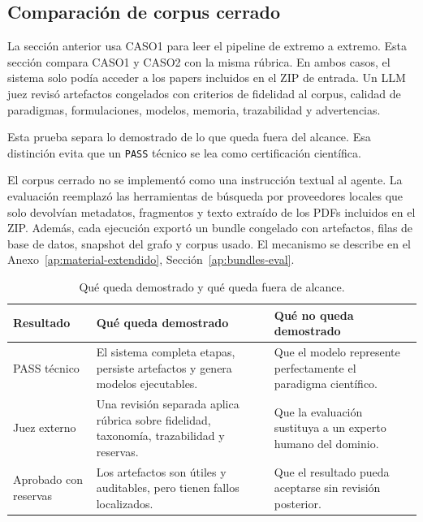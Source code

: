 \subsection{Comparación de corpus cerrado}
\label{sec:evaluacion-corpus-cerrado}

La sección anterior usa CASO1 para leer el pipeline de extremo a extremo. Esta
sección compara CASO1 y CASO2 con la misma rúbrica. En ambos casos, el sistema
solo podía acceder a los papers incluidos en el ZIP de entrada. Un LLM juez
revisó artefactos congelados con criterios de fidelidad al corpus, calidad de
paradigmas, formulaciones, modelos, memoria, trazabilidad y advertencias.

Esta prueba separa lo demostrado de lo que queda fuera del alcance. Esa
distinción evita que un \texttt{PASS} técnico se lea como certificación
científica.

El corpus cerrado no se implementó como una instrucción textual al agente. La
evaluación reemplazó las herramientas de búsqueda por proveedores locales que
solo devolvían metadatos, fragmentos y texto extraído de los PDFs incluidos en
el ZIP. Además, cada ejecución exportó un bundle congelado con artefactos,
filas de base de datos, snapshot del grafo y corpus usado. El mecanismo se
describe en el Anexo~\ref{ap:material-extendido},
Sección~\ref{ap:bundles-eval}.

\begin{table}[H]
\begin{center}
\small
\begin{tabular}{|p{3.1cm}|p{4.9cm}|p{4.5cm}|} \hline
\textbf{Resultado} & \textbf{Qué queda demostrado} & \textbf{Qué no queda demostrado} \\ \hline
PASS técnico & El sistema completa etapas, persiste artefactos y genera modelos ejecutables. & Que el modelo represente perfectamente el paradigma científico. \\ \hline
Juez externo & Una revisión separada aplica rúbrica sobre fidelidad, taxonomía, trazabilidad y reservas. & Que la evaluación sustituya a un experto humano del dominio. \\ \hline
Aprobado con reservas & Los artefactos son útiles y auditables, pero tienen fallos localizados. & Que el resultado pueda aceptarse sin revisión posterior. \\ \hline
\end{tabular}
\caption{Qué queda demostrado y qué queda fuera de alcance.}
\end{center}
\end{table}

